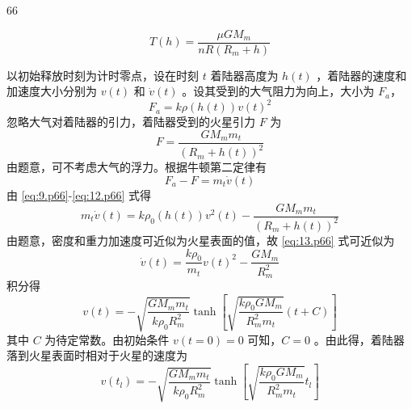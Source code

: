 \begin{solution}{66}
\begin{subsolution}
\begin{equation}
            T(h) = \frac{\mu G M_{m}}{n R (R_{m}+h)} \label{eq:9.p66}
        \end{equation}
    \end{subsolution}
    \begin{subsolution}
        以初始释放时刻为计时零点，设在时刻 $t$ 着陆器高度为 $h(t)$ ，着陆器的速度和加速度大小分别为 $v(t)$ 和 $\dot{v}(t)$ 。设其受到的大气阻力为向上，大小为 $F_{a}$，
        \begin{equation}
            F_{a} = k \rho(h(t)) v(t)^{2} \label{eq:10.p66}
        \end{equation}
        忽略大气对着陆器的引力，着陆器受到的火星引力 $F$ 为
        \begin{equation}
            F = \frac{G M_{m} m_{t}}{(R_{m}+h(t))^{2}} \label{eq:11.p66}
        \end{equation}
        由题意，可不考虑大气的浮力。根据牛顿第二定律有
        \begin{equation}
            F_{a} - F = m_{t} \dot{v}(t) \label{eq:12.p66}
        \end{equation}
        由 \eqref{eq:9.p66}-\eqref{eq:12.p66} 式得
        \begin{equation}
            m_{t} \dot{v}(t) = k \rho_{0} (h(t)) v^{2}(t) - \frac{G M_{m} m_{t}}{(R_{m}+h(t))^{2}} \label{eq:13.p66}
        \end{equation}
        由题意，密度和重力加速度可近似为火星表面的值，故 \eqref{eq:13.p66} 式可近似为
        \begin{equation}
            \dot{v}(t) = \frac{k \rho_{0}}{m_{t}} v(t)^{2} - \frac{G M_{m}}{R_{m}^{2}} \label{eq:14.p66}
        \end{equation}
        积分得
        \begin{equation}
            v(t) = -\sqrt{\frac{G M_{m} m_{t}}{k \rho_{0} R_{m}^{2}}} \tanh \left[ \sqrt{\frac{k \rho_{0} G M_{m}}{R_{m}^{2} m_{t}}} (t+C) \right] \label{eq:15.p66}
        \end{equation}
        其中 $C$ 为待定常数。由初始条件 $v(t=0)=0$ 可知，$C=0$ 。由此得，着陆器落到火星表面时相对于火星的速度为
        \begin{equation}
            v(t_{l}) = -\sqrt{\frac{G M_{m} m_{t}}{k \rho_{0} R_{m}^{2}}} \tanh \left[ \sqrt{\frac{k \rho_{0} G M_{m}}{R_{m}^{2} m_{t}}} t_{l} \right] \label{eq:16.p66}
        \end{equation}
    \end{subsolution}
\end{solution}